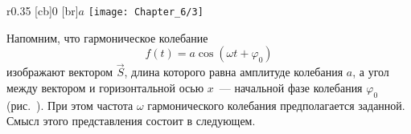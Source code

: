 







\begin{wrapfigure}[]{r}{0.35\textwidth}
	[cb]{0}
	[br]{$a$}
	\texttt{[image: Chapter\_6/3]}
	\caption{}
\end{wrapfigure}

Напомним, что гармоническое колебание
\begin{equation*}
	f(t)=a\cos(\omega t+\varphi_0)
\end{equation*}
изображают вектором $\vec{S}$, длина которого равна амплитуде колебания $a$, а угол между вектором и горизонтальной осью
$x$~--- начальной фазе колебания $\varphi_0$ (рис.~). При этом частота $\omega$ гармонического колебания предполагается
заданной. Смысл этого представления состоит в следующем.


